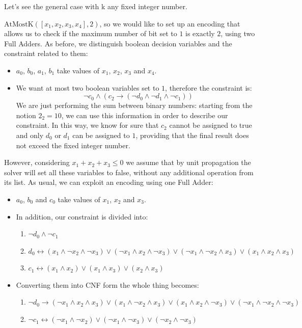 Let's see the general case with k any fixed integer number. \vspace{7pt}

$\text{AtMostK}([x_1, x_2, x_3, x_4], 2)$, so we would like to set up an encoding that allows us to check if the maximum number of bit set to $1$ is exactly 
$2$, using two Full Adders. As before, we distinguish boolean decision variables and the constraint related to them:
\begin{itemize}
    \renewcommand{\labelitemi}{-}
    \item $a_0$, $b_0$, $a_1$, $b_1$ take values of $x_1$, $x_2$, $x_3$ and $x_4$.
    \item We want at most two boolean variables set to $1$, therefore the constraint is:
    $$\neg c_0 \wedge (c_2 \rightarrow (\neg d_0 \wedge \neg d_1 \wedge \neg c_1))$$ 
    We are just performing the sum between binary numbers: starting from the notion $2_2 = 10$, we can use this information in order to describe our constraint.
    In this way, we know for sure that $c_2$ cannot be assigned to true and only $d_0$ or $d_1$ can be assigned to $1$, providing that the final result 
    does not exceed the fixed integer number.
\end{itemize}
However, considering $x_1 + x_2 + x_3 \leq 0$ we assume that by unit propagation the solver will set all these variables to false, without any additional 
operation from its list. As usual, we can exploit an encoding using one Full Adder:
\begin{itemize}
    \renewcommand{\labelitemi}{-}
    \item $a_0$, $b_0$ and $c_0$ take values of $x_1$, $x_2$ and $x_3$.
    \item In addition, our constraint is divided into:
    \begin{enumerate}
        \item $\neg d_0 \wedge \neg c_1$
        \item $d_0 \leftrightarrow (x_1 \wedge \neg x_2 \wedge \neg x_3) \vee (\neg x_1 \wedge x_2 \wedge \neg x_3) \vee (\neg x_1 \wedge \neg x_2 \wedge x_3) \vee (x_1 \wedge x_2 \wedge x_3)$
        \item $c_1 \leftrightarrow (x_1 \wedge x_2) \vee (x_1 \wedge x_3) \vee (x_2 \wedge x_3)$
    \end{enumerate}
    \item Converting them into CNF form the whole thing becomes:
    \begin{enumerate}[start = 2]
        \item $\neg d_0 \rightarrow (\neg x_1 \wedge x_2 \wedge x_3) \vee (x_1 \wedge \neg x_2 \wedge x_3) \vee (x_1 \wedge x_2 \wedge \neg x_3) \vee (\neg x_1 \wedge \neg x_2 \wedge \neg x_3)$
        \item $\neg c_1 \leftrightarrow (\neg x_1 \wedge \neg x_2) \vee (\neg x_1 \wedge \neg x_3) \vee (\neg x_2 \wedge \neg x_3)$
    \end{enumerate}
\end{itemize}
